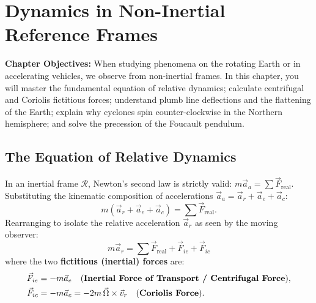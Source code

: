 \chapter{Dynamics in Non-Inertial Reference Frames}
\label{ch:noninertial_text}

\begin{chapterintro}
\textbf{Chapter Objectives:} When studying phenomena on the rotating Earth or in accelerating vehicles, we observe from non-inertial frames. In this chapter, you will master the fundamental equation of relative dynamics; calculate centrifugal and Coriolis fictitious forces; understand plumb line deflections and the flattening of the Earth; explain why cyclones spin counter-clockwise in the Northern hemisphere; and solve the precession of the Foucault pendulum.
\end{chapterintro}

\section{The Equation of Relative Dynamics}

In an inertial frame $\mathcal{R}$, Newton's second law is strictly valid: $m\vec{a}_a = \sum\vec{F}_{\text{real}}$.
Substituting the kinematic composition of accelerations $\vec{a}_a = \vec{a}_r + \vec{a}_e + \vec{a}_c$:
\[
m\left(\vec{a}_r + \vec{a}_e + \vec{a}_c\right) = \sum\vec{F}_{\text{real}}.
\]
Rearranging to isolate the relative acceleration $\vec{a}_r$ as seen by the moving observer:
\[
\boxed{m\vec{a}_r = \sum\vec{F}_{\text{real}} + \vec{F}_{ie} + \vec{F}_{ic}}
\]
where the two \textbf{fictitious (inertial) forces} are:
\begin{align}
\vec{F}_{ie} &= -m\vec{a}_e \quad \text{(\textbf{Inertial Force of Transport / Centrifugal Force})}, \\
\vec{F}_{ic} &= -m\vec{a}_c = -2m\,\vec{\Omega}\times\vec{v}_r \quad \text{(\textbf{Coriolis Force})}.
\end{align}


